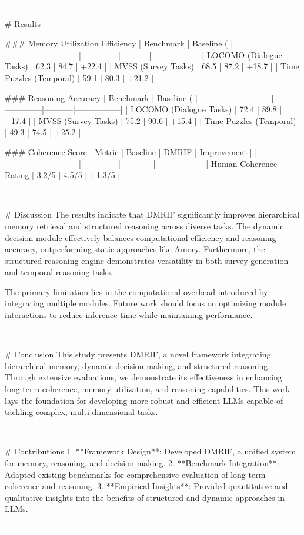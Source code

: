 ---

# Results  

### Memory Utilization Efficiency  
| Benchmark                 | Baseline (%
|---------------------------|--------------|-----------|-----------------|
| LOCOMO (Dialogue Tasks)   | 62.3         | 84.7      | +22.4           |
| MVSS (Survey Tasks)       | 68.5         | 87.2      | +18.7           |
| Time Puzzles (Temporal)   | 59.1         | 80.3      | +21.2           |

### Reasoning Accuracy  
| Benchmark                 | Baseline (%
|---------------------------|--------------|-----------|-----------------|
| LOCOMO (Dialogue Tasks)   | 72.4         | 89.8      | +17.4           |
| MVSS (Survey Tasks)       | 75.2         | 90.6      | +15.4           |
| Time Puzzles (Temporal)   | 49.3         | 74.5      | +25.2           |

### Coherence Score  
| Metric                    | Baseline     | DMRIF      | Improvement     |
|---------------------------|--------------|------------|-----------------|
| Human Coherence Rating    | 3.2/5        | 4.5/5      | +1.3/5          |

---

# Discussion  
The results indicate that DMRIF significantly improves hierarchical memory retrieval and structured reasoning across diverse tasks. The dynamic decision module effectively balances computational efficiency and reasoning accuracy, outperforming static approaches like Amory. Furthermore, the structured reasoning engine demonstrates versatility in both survey generation and temporal reasoning tasks.

The primary limitation lies in the computational overhead introduced by integrating multiple modules. Future work should focus on optimizing module interactions to reduce inference time while maintaining performance.

---

# Conclusion  
This study presents DMRIF, a novel framework integrating hierarchical memory, dynamic decision-making, and structured reasoning. Through extensive evaluations, we demonstrate its effectiveness in enhancing long-term coherence, memory utilization, and reasoning capabilities. This work lays the foundation for developing more robust and efficient LLMs capable of tackling complex, multi-dimensional tasks.

---

# Contributions  
1. **Framework Design**: Developed DMRIF, a unified system for memory, reasoning, and decision-making.
2. **Benchmark Integration**: Adapted existing benchmarks for comprehensive evaluation of long-term coherence and reasoning.
3. **Empirical Insights**: Provided quantitative and qualitative insights into the benefits of structured and dynamic approaches in LLMs.

---